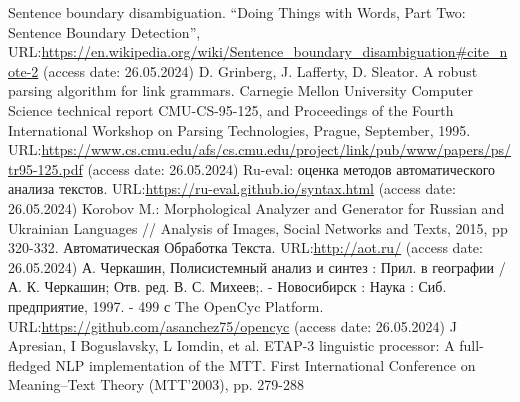 \documentclass[
]{ceurart}
\begin{document}
\begin{thebibliography}{9}
  Sentence boundary disambiguation. ``Doing Things with Words, Part Two:
  Sentence Boundary Detection'',
  URL:\url{https://en.wikipedia.org/wiki/Sentence_boundary_disambiguation\#cite_note-2}
  (access date: 26.05.2024)
  D. Grinberg, J. Lafferty, D. Sleator. A robust parsing algorithm for
  link grammars. Carnegie Mellon University Computer Science technical
  report CMU-CS-95-125, and Proceedings of the Fourth International
  Workshop on Parsing Technologies, Prague, September, 1995.
  URL:\url{https://www.cs.cmu.edu/afs/cs.cmu.edu/project/link/pub/www/papers/ps/tr95-125.pdf}
  (access date: 26.05.2024)
  Ru-eval: оценка методов автоматического анализа текстов.
  URL:\url{https://ru-eval.github.io/syntax.html}
  (access date: 26.05.2024)
  Korobov M.: Morphological Analyzer and Generator for Russian and
  Ukrainian Languages // Analysis of Images, Social Networks and Texts,
  2015, pp 320-332.
  Автоматическая Обработка Текста.
  URL:\url{http://aot.ru/}
  (access date: 26.05.2024)
  А. Черкашин, Полисистемный анализ и синтез : Прил. в географии / А. К.
  Черкашин; Отв. ред. В. С. Михеев;. - Новосибирск : Наука : Сиб.
  предприятие, 1997. - 499 с
  The OpenCyc Platform.
  URL:\url{https://github.com/asanchez75/opencyc}
  (access date: 26.05.2024)
  J Apresian, I Boguslavsky, L Iomdin, et al. ETAP-3 linguistic
  processor: A full-fledged NLP implementation of the MTT. First
  International Conference on Meaning--Text Theory (MTT'2003), pp.
  279-288
\end{thebibliography}
\end{document}
